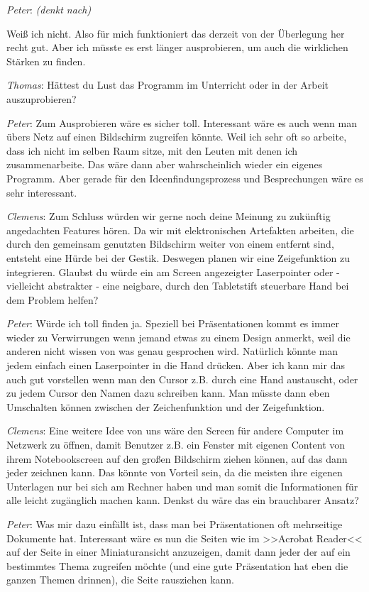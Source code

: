 \medskip \emph{Peter}: \emph{(denkt nach)} 

\smallskip Weiß ich nicht. Also für mich funktioniert das derzeit von der Überlegung her recht gut. Aber ich müsste es erst länger ausprobieren, um auch die wirklichen Stärken zu finden.

\medskip \emph{Thomas}: Hättest du Lust das Programm im Unterricht oder in der Arbeit auszuprobieren?

\medskip \emph{Peter}: Zum Ausprobieren wäre es sicher toll. Interessant wäre es auch wenn man übers Netz auf einen Bildschirm zugreifen könnte. Weil ich sehr oft so arbeite, dass ich nicht im selben Raum sitze, mit den Leuten mit denen ich zusammenarbeite. Das wäre dann aber wahrscheinlich wieder ein eigenes Programm. Aber gerade für den Ideenfindungsprozess und Besprechungen wäre es sehr interessant.

\medskip \emph{Clemens}: Zum Schluss würden wir gerne noch deine Meinung zu zukünftig angedachten Features hören. 
Da wir mit elektronischen Artefakten arbeiten, die durch den gemeinsam genutzten Bildschirm weiter von einem entfernt sind, entsteht eine Hürde bei der Gestik. Deswegen planen wir eine Zeigefunktion zu integrieren. Glaubst du würde ein am Screen angezeigter Laserpointer oder - vielleicht abstrakter - eine neigbare, durch den Tabletstift steuerbare Hand bei dem Problem helfen?

\medskip \emph{Peter}: Würde ich toll finden ja. Speziell bei Präsentationen kommt es immer wieder zu Verwirrungen wenn jemand etwas zu einem Design anmerkt, weil die anderen nicht wissen von was genau gesprochen wird. Natürlich könnte man jedem einfach einen Laserpointer in die Hand drücken. Aber ich kann mir das auch gut vorstellen wenn man den Cursor z.B. durch eine Hand austauscht, oder zu jedem Cursor den Namen dazu schreiben kann. Man müsste dann eben Umschalten können zwischen der Zeichenfunktion und der Zeigefunktion.

\medskip \emph{Clemens}: Eine weitere Idee von uns wäre den Screen für andere Computer im Netzwerk zu öffnen, damit Benutzer z.B. ein Fenster mit eigenen Content von ihrem Notebookscreen auf den großen Bildschirm ziehen können, auf das dann jeder zeichnen kann. Das könnte von Vorteil sein, da die meisten ihre eigenen Unterlagen nur bei sich am Rechner haben und man somit die Informationen für alle leicht zugänglich machen kann. Denkst du wäre das ein brauchbarer Ansatz?

\medskip \emph{Peter}: Was mir dazu einfällt ist, dass man bei Präsentationen oft mehrseitige Dokumente hat. Interessant wäre es nun die Seiten wie im >>Acrobat Reader<< auf der Seite in einer Miniaturansicht anzuzeigen, damit dann jeder der auf ein bestimmtes Thema zugreifen möchte (und eine gute Präsentation hat eben die ganzen Themen drinnen), die Seite rausziehen kann.

